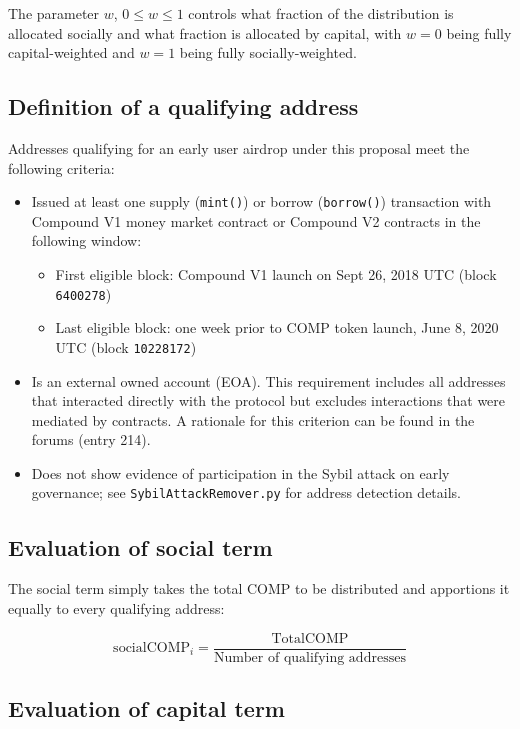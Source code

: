\documentclass[12pt]{article}
\begin{document}
The parameter $w$, $0 \leq w \leq 1$ controls what fraction of the distribution is allocated socially
and what fraction is allocated by capital, with $w=0$ being fully capital-weighted and $w=1$ being
fully socially-weighted. 

\subsection{Definition of a qualifying address}
\label{qualify}
Addresses qualifying for an early user airdrop under this proposal meet the following criteria:
\begin{itemize}
  \item{Issued at least one supply (\texttt{mint()}) or borrow (\texttt{borrow()}) transaction
        with Compound V1 money market contract or Compound V2 contracts in the following window:
        \begin{itemize}
           \item{First eligible block: Compound V1 launch on Sept 26, 2018 UTC (block \texttt{6400278})}
           \item{Last eligible block: one week prior to COMP token launch, June 8, 2020 UTC (block \texttt{10228172})}
        \end{itemize}
       }
  \item{Is an external owned account (EOA). This requirement includes all addresses that
        interacted directly with the protocol but excludes interactions that were mediated
        by contracts. A rationale for this criterion can be found in the forums (entry 214).}
  \item{Does not show evidence of participation in the Sybil attack on early governance; see
        \texttt{SybilAttackRemover.py} for address detection details.}
\end{itemize}

\subsection{Evaluation of social term} 

The social term simply takes the total COMP to be distributed and apportions it
equally to every qualifying address:

\begin{equation*}
  \mathrm{socialCOMP}_i = \frac{\mathrm{TotalCOMP}}{\textrm{Number of qualifying addresses}}
\end{equation*}

\subsection{Evaluation of capital term}
\end{document}
